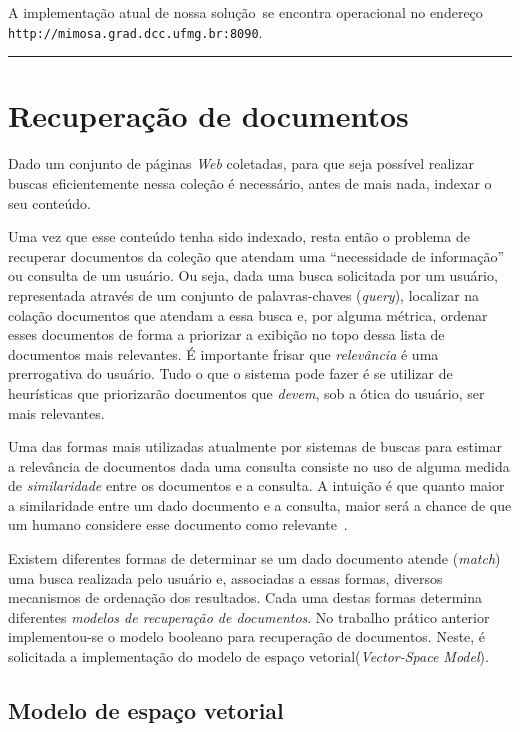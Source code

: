\documentclass[10pt,twocolumn]{article}
\begin{document}
A implementação atual de nossa solução\
 se encontra operacional no
endereço \texttt{http://mimosa.grad.dcc.ufmg.br:8090}.

\rule[0.5mm]{0.9\linewidth}{0.5mm}


\section{Recuperação de documentos}\label{sec:retrieval}

Dado um conjunto de páginas \emph{Web} coletadas, para que seja possível
realizar buscas eficientemente nessa coleção é necessário, antes de mais
nada, indexar o seu conteúdo.

Uma vez que esse conteúdo tenha sido indexado, resta então o problema
de recuperar documentos da coleção que atendam uma ``necessidade de
informação'' ou consulta de um usuário. Ou seja, dada uma busca solicitada por um
usuário, representada através de um
conjunto de palavras-chaves (\emph{query}), localizar na colação
documentos que atendam a essa busca e, por alguma métrica, ordenar esses
documentos de forma a priorizar a exibição no topo dessa lista de
documentos mais relevantes. É importante frisar que
\emph{relevância} é uma prerrogativa do usuário. Tudo o que o sistema
pode fazer é se utilizar de heurísticas que priorizarão documentos que
\emph{devem}, sob a ótica do usuário, ser mais relevantes.

Uma das formas mais utilizadas atualmente por sistemas de buscas para
estimar a relevância de documentos dada uma consulta consiste no uso de
alguma medida de \emph{similaridade} entre os documentos e a consulta. A
intuição é que quanto maior a similaridade entre um dado documento e a
consulta, maior será a chance de que um humano considere esse documento
como relevante~\cite{moffat2006survey}.

Existem diferentes formas de determinar se um dado documento
atende (\emph{match}) uma busca  realizada pelo usuário e, associadas a
essas formas, diversos mecanismos de ordenação dos resultados. Cada uma
destas formas determina diferentes \emph{modelos de recuperação de
documentos}. No trabalho prático anterior implementou-se o modelo
booleano para recuperação de documentos. Neste, é solicitada a
implementação do modelo de espaço vetorial(\emph{Vector-Space Model}).

\subsection{Modelo de espaço vetorial}
\end{document}
